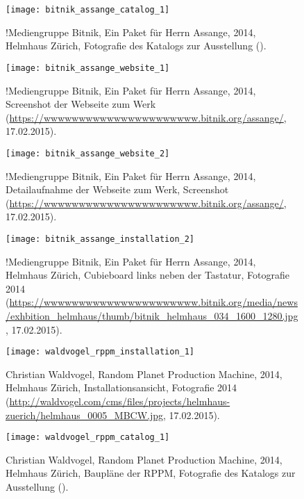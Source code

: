 \documentclass[
paper=164mm:234mm, %
pagesize, %
DIV=calc, %
10pt, %
parskip=half- %
]{scrbook}
\begin{document}
\begin{figure}[H]
	\centering
	\texttt{[image: bitnik\_assange\_catalog\_1]}
	\caption{!Mediengruppe Bitnik, Ein Paket für Herrn Assange, 2014, Helmhaus Zürich, Fotografie des Katalogs zur Ausstellung (\cite[14-15]{Ryser/MediengruppeBitnik:2014}).}
	\label{fig:bitnik_assange_catalog_1}
\end{figure}

\begin{figure}[H]
	\centering
	\texttt{[image: bitnik\_assange\_website\_1]}
	\caption{!Mediengruppe Bitnik, Ein Paket für Herrn Assange, 2014, Screenshot der Webseite zum Werk  (\url{https://wwwwwwwwwwwwwwwwwwwwww.bitnik.org/assange/}, 17.02.2015).}
	\label{fig:bitnik_assange_Webseite_1}
\end{figure}

\begin{figure}[H]
	\centering
	\texttt{[image: bitnik\_assange\_website\_2]}
	\caption{!Mediengruppe Bitnik, Ein Paket für Herrn Assange, 2014, Detailaufnahme der Webseite zum Werk, Screenshot (\url{https://wwwwwwwwwwwwwwwwwwwwww.bitnik.org/assange/}, 17.02.2015).}
	\label{fig:bitnik_assange_Webseite_2}
\end{figure}

\begin{figure}[H]
	\centering
	\texttt{[image: bitnik\_assange\_installation\_2]}
	\caption{!Mediengruppe Bitnik, Ein Paket für Herrn Assange, 2014, Helmhaus Zürich, Cubieboard links neben der Tastatur, Fotografie 2014 (\url{https://wwwwwwwwwwwwwwwwwwwwww.bitnik.org/media/news/exhbition_helmhaus/thumb/bitnik_helmhaus_034_1600_1280.jpg}, 17.02.2015).}
	\label{fig:bitnik_assange_installation_2}
\end{figure}

\begin{figure}[H]
	\centering
	\texttt{[image: waldvogel\_rppm\_installation\_1]}
	\caption{Christian Waldvogel, Random Planet Production Machine, 2014, Helmhaus Zürich, Installationsansicht, Fotografie 2014 (\url{http://waldvogel.com/cms/files/projects/helmhaus-zuerich/helmhaus_0005_MBCW.jpg}, 17.02.2015).}
	\label{fig:waldvogel_rppm_installation_1}
\end{figure}

\begin{figure}[H]
	\centering
	\texttt{[image: waldvogel\_rppm\_catalog\_1]}
	\caption{Christian Waldvogel, Random Planet Production Machine, 2014, Helmhaus Zürich, Baupläne der RPPM, Fotografie des Katalogs zur Ausstellung (\cite[20-21]{Waldvogel:2014}).}
	\label{fig:waldvogel_rppm_catalog_1}
\end{figure}
\end{document}
